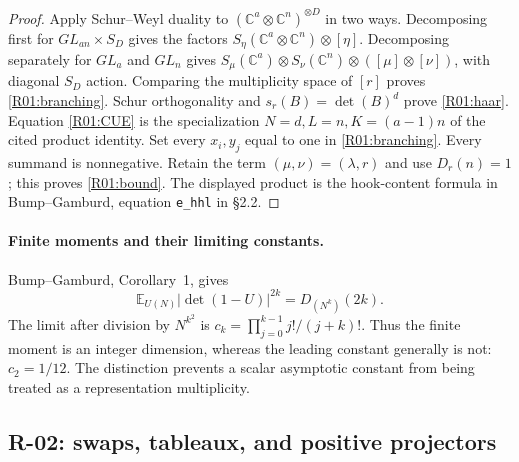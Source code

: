 \documentclass[11pt,a4paper]{article}
\theoremstyle{definition}\newtheorem{definition}{Definition}
\begin{document}
\begin{proof}
Apply Schur--Weyl duality to $(\mathbb C^a\otimes\mathbb C^n)^{\otimes D}$
in two ways. Decomposing first for $GL_{an}\times S_D$ gives the factors
$S_\eta(\mathbb C^a\otimes\mathbb C^n)\otimes[\eta]$.
Decomposing separately for $GL_a$ and $GL_n$ gives
$S_\mu(\mathbb C^a)\otimes S_\nu(\mathbb C^n)\otimes
([\mu]\otimes[\nu])$, with diagonal $S_D$ action. Comparing the multiplicity
space of $[r]$ proves \eqref{R01:branching}. Schur orthogonality and
$s_r(B)=\det(B)^d$ prove \eqref{R01:haar}. Equation \eqref{R01:CUE} is the
specialization $N=d,L=n,K=(a-1)n$ of the cited product identity.
Set every $x_i,y_j$ equal to one in \eqref{R01:branching}. Every summand is
nonnegative. Retain the term $(\mu,\nu)=(\lambda,r)$ and use
$D_r(n)=1$; this proves \eqref{R01:bound}. The displayed product is the
hook-content formula in Bump--Gamburd, equation \texttt{e\_hhl} in \S2.2.
\end{proof}

\paragraph{Finite moments and their limiting constants.}
Bump--Gamburd, Corollary~1, gives
\[
 \mathbb E_{U(N)}|\det(1-U)|^{2k}=D_{(N^k)}(2k).
\]
The limit after division by $N^{k^2}$ is
$c_k=\prod_{j=0}^{k-1}j!/(j+k)!$. Thus the finite moment is an integer
dimension, whereas the leading constant generally is not: $c_2=1/12$.
The distinction prevents a scalar asymptotic constant from being treated as
a representation multiplicity.

\subsection{R-02: swaps, tableaux, and positive projectors}
\end{document}
